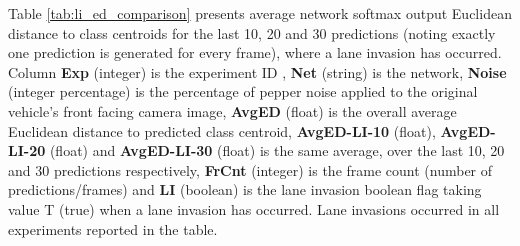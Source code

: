 Table \ref{tab:li_ed_comparison} presents average network softmax output Euclidean distance to class centroids for the last 10, 20 and 30 predictions (noting exactly one prediction is generated for every frame), where a lane invasion has occurred. Column \textbf{Exp} (integer) is the experiment ID , \textbf{Net} (string) is the network, \textbf{Noise} (integer percentage) is the percentage of pepper noise applied to the original vehicle's front facing camera image, \textbf{AvgED} (float) is the overall average Euclidean distance to predicted class centroid, \textbf{AvgED-LI-10} (float), \textbf{AvgED-LI-20} (float)  and \textbf{AvgED-LI-30} (float) is the same average, over the last 10, 20 and 30 predictions respectively, \textbf{FrCnt} (integer) is the frame count (number of predictions/frames) and \textbf{LI} (boolean) is the lane invasion boolean flag taking value T (true) when a lane invasion has occurred. Lane invasions occurred in all experiments reported in the table.





